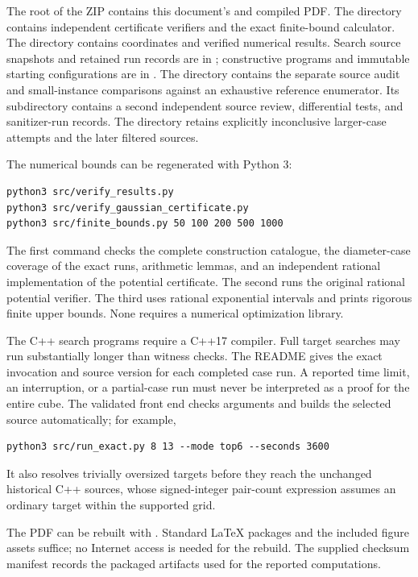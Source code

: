 
The root of the ZIP contains this document's  and
compiled PDF. The  directory contains independent
certificate verifiers and the exact finite-bound calculator.
The  directory contains coordinates and verified numerical
results. Search source snapshots and retained run records are in
; constructive programs and immutable starting
configurations are in . The
 directory contains the separate source audit and
small-instance comparisons against an exhaustive reference enumerator.
Its  subdirectory contains a second independent
source review, differential tests, and sanitizer-run records. The
 directory retains explicitly
inconclusive larger-case attempts and the later filtered sources.

The numerical bounds can be regenerated with Python 3:
\begin{lstlisting}
python3 src/verify_results.py
python3 src/verify_gaussian_certificate.py
python3 src/finite_bounds.py 50 100 200 500 1000
\end{lstlisting}
The first command checks the complete construction catalogue, the
diameter-case coverage of the exact runs, arithmetic lemmas, and an
independent rational implementation of the potential certificate. The
second runs the original rational potential verifier. The third uses
rational exponential intervals and prints rigorous finite upper
bounds. None requires a numerical optimization library.

The C++ search programs require a C++17 compiler. Full target searches
may run substantially longer than witness checks. The README gives the
exact invocation and source version for each completed case run. A
reported time limit, an interruption, or a partial-case run must never
be interpreted as a proof for the entire cube.
The validated front end  checks arguments and
builds the selected source automatically; for example,
\begin{lstlisting}
python3 src/run_exact.py 8 13 --mode top6 --seconds 3600
\end{lstlisting}
It also resolves trivially oversized targets before they reach the
unchanged historical C++ sources, whose signed-integer pair-count
expression assumes an ordinary target within the supported grid.

The PDF can be rebuilt with . Standard
LaTeX packages and the included figure assets suffice; no Internet
access is needed for the rebuild. The supplied checksum manifest records
the packaged artifacts used for the reported computations.
